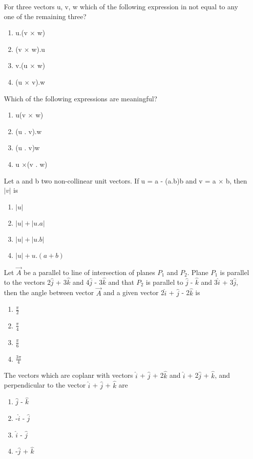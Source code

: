 \item For three vectors u, v, w which of the following expression in not equal to any one of the remaining three?
\begin{enumerate}
\item u.(v $\times$ w)
\item (v $\times$ w).u
\item v.(u $\times$ w)
\item (u $\times$ v).w
\end{enumerate}

\item Which of the following expressions are meaningful?
\begin{enumerate}
\item u(v $\times$ w)
\item (u . v).w
\item (u . v)w
\item u $\times$(v . w)
\end{enumerate}

\item Let a and b two non-collinear unit vectors. If u = a - (a.b)b and v = a $\times$ b, then $|v|$ is
\begin{enumerate}
\item $|u|$
\item $|u| + |u.a|$
\item $|u| + |u.b|$
\item $|u| + u.(a+b)$
\end{enumerate}

\item Let $\overrightarrow{A}$ be a parallel to line of intersection of planes $P_1$ and $P_2$. Plane $P_1$ is parallel to the vectors 2$\hat{j}$ + 3$\hat{k}$ and 4$\hat{j}$ - 3$\hat{k}$ and that $P_2$ is parallel to 
$\hat{j}$ - $\hat{k}$ and 3$\hat{i}$ + 3$\hat{j}$, then the angle between vector $\overrightarrow{A}$ and a given vector 2$\hat{i}$ + $\hat{j}$ - 2$\hat{k}$ is
\begin{enumerate}
\item $\frac{\pi}{2}$
\item $\frac{\pi}{4}$
\item $\frac{\pi}{6}$
\item $\frac{3\pi}{4}$
\end{enumerate}

\item The vectors which are coplanr with vectors $\hat{i}$ + $\hat{j}$ + 2$\hat{k}$ and $\hat{i}$ + 2$\hat{j}$ + $\hat{k}$, and perpendicular to the vector $\hat{i}$ + $\hat{j}$ + $\hat{k}$ are
\begin{enumerate}
\item $\hat{j}$ - $\hat{k}$
\item -$\hat{i}$ - $\hat{j}$
\item $\hat{i}$ - $\hat{j}$
\item -$\hat{j}$ + $\hat{k}$
\end{enumerate}


